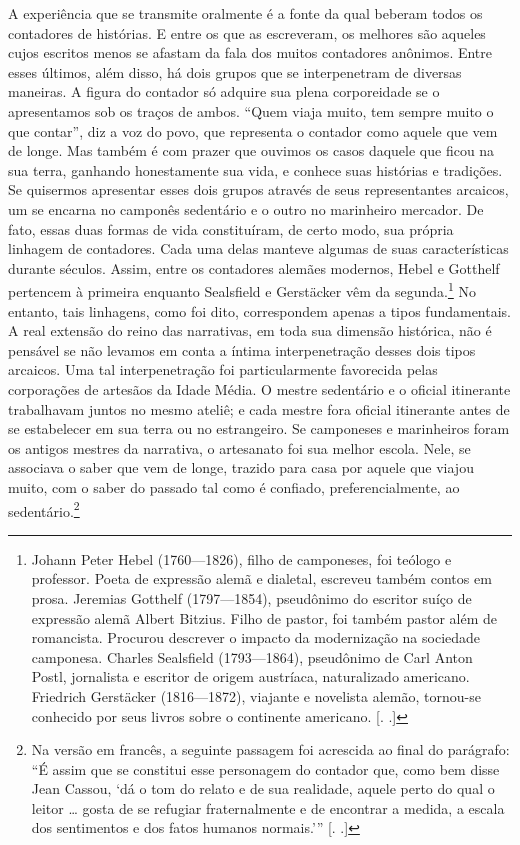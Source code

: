 A experiência que se transmite oralmente é a fonte da qual beberam todos
os contadores de histórias. E entre os que as escreveram, os melhores
são aqueles cujos escritos menos se afastam da fala dos muitos
contadores anônimos. Entre esses últimos, além disso, há dois grupos que
se interpenetram de diversas maneiras. A figura do contador só adquire
sua plena corporeidade se o apresentamos sob os traços de ambos. ``Quem
viaja muito, tem sempre muito o que contar'', diz a voz do povo, que
representa o contador como aquele que vem de longe. Mas também é com
prazer que ouvimos os casos daquele que ficou na sua terra, ganhando
honestamente sua vida, e conhece suas histórias e tradições. Se
quisermos apresentar esses dois grupos através de seus representantes
arcaicos, um se encarna no camponês sedentário e o outro no marinheiro
mercador. De fato, essas duas formas de vida constituíram, de certo
modo, sua própria linhagem de contadores. Cada uma delas manteve algumas
de suas características durante séculos. Assim, entre os contadores
alemães modernos, Hebel e Gotthelf pertencem à primeira enquanto
Sealsfield e Gerstäcker vêm da segunda.\footnote{Johann Peter Hebel
  (1760---1826), filho de camponeses, foi teólogo e professor. Poeta de
  expressão alemã e dialetal, escreveu também contos em prosa. Jeremias
  Gotthelf (1797---1854), pseudônimo do escritor suíço de expressão alemã
  Albert Bitzius. Filho de pastor, foi também pastor além de romancista.
  Procurou descrever o impacto da modernização na sociedade camponesa.
  Charles Sealsfield (1793---1864), pseudônimo de Carl Anton Postl,
  jornalista e escritor de origem austríaca, naturalizado americano.
  Friedrich Gerstäcker (1816---1872), viajante e novelista alemão,
  tornou-se conhecido por seus livros sobre o continente americano.
  [. .]} No entanto, tais linhagens, como foi dito,
correspondem apenas a tipos fundamentais. A real extensão do reino das
narrativas, em toda sua dimensão histórica, não é pensável se não
levamos em conta a íntima interpenetração desses dois tipos arcaicos.
Uma tal interpenetração foi particularmente favorecida pelas corporações
de artesãos da Idade Média. O mestre sedentário e o oficial itinerante trabalhavam juntos no mesmo ateliê; e cada mestre fora oficial itinerante
antes de se estabelecer em sua terra ou no estrangeiro. Se camponeses e
marinheiros foram os antigos mestres da narrativa, o artesanato foi sua
melhor escola. Nele, se associava o saber que vem de longe, trazido para
casa por aquele que viajou muito, com o saber do passado tal como 
é confiado, preferencialmente, ao sedentário.\footnote{Na versão em
  francês, a seguinte passagem foi acrescida ao final do parágrafo: ``É
  assim que se constitui esse personagem do contador que, como bem disse
  Jean Cassou, `dá o tom do relato e de sua realidade, aquele perto do
  qual o leitor \ldots{} gosta de se refugiar fraternalmente e de
  encontrar a medida, a escala dos sentimentos e dos fatos humanos
  normais.''' [. .]}

